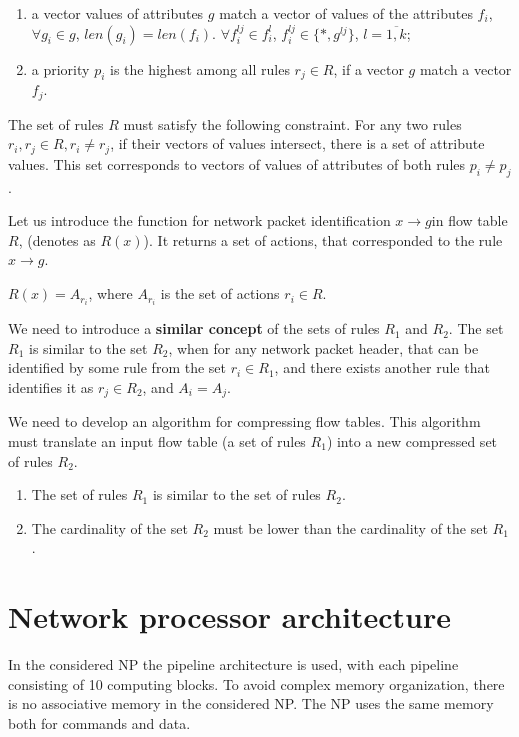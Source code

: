 \documentclass[conference]{IEEEtran}
\begin{document}
        \begin{enumerate}
            \item a vector values of attributes \(g\) match a vector of values of the attributes \(f_i\), 
                \(\forall g_i \in g\), \(len(g_i) = len(f_i)\). \(\forall f_i^{lj} \in f_i^l\), \(f_i^{lj} \in \{*, g^{lj}\}\), \(l=\overline{1,k}\);
            \item a priority \(p_i\) is the highest among all rules \(r_j\in R\), if a vector \(g\) match a vector\(f_j\).
        \end{enumerate}

        The set of rules \(R\) must satisfy the following constraint. 
        For any two rules \(r_i,r_j\in R,r_i\not= r_j\),  if their vectors of values intersect, there is a set of attribute values. 
        This set corresponds to vectors of values of attributes of both rules  \(p_i\not= p_j\). 
        
        Let us introduce the function for network packet identification \(x \rightarrow g\)in flow table \(R\), (denotes as \(R(x)\)).
        It returns a set of actions, that corresponded to the rule \(x \rightarrow g\). 
        \begin{center}
            \(R(x) = A_{r_i}\), where \(A_{r_i}\) is the set of actions \(r_i \in R\).
        \end{center}

        We need to introduce a {\bf similar concept} of the sets of rules \(R_1\) and \(R_2\).
        The set \(R_1\) is similar to the set \(R_2\), when for any network packet header, 
        that can be identified by some rule from the set \(r_i \in R_1\),
        and there exists another rule that identifies it as \(r_j \in R_2\), and \(A_i = A_j\).

        We need to develop an algorithm for compressing flow tables. This algorithm must translate an input flow table (a set of rules \(R_1\))
        into a new compressed set of rules \(R_2\). 
        \begin{enumerate}
            \item The set of rules \(R_1\) is similar to the set of rules \(R_2\).
            \item The cardinality of the set \(R_2\) must be lower than the cardinality of the set \(R_1\).
        \end{enumerate}
    
    \section{Network processor architecture}
            \label{section:problem}
        In the considered NP the pipeline architecture is used, with each pipeline consisting of 10 computing blocks. 
        To avoid complex memory organization, there is no associative memory in the considered NP. 
        The NP uses the same memory both for commands and data.
         
\end{document}
